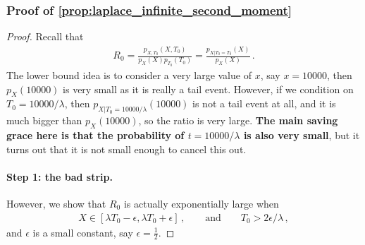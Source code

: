 \subsubsection{Proof of \cref{prop:laplace_infinite_second_moment}}
\label{proof:laplace_infinite_second_moment}
\begin{proof}
    Recall that
    \begin{align}
        R_0
        = \frac{p_{X,T_0}(X, T_0)}{p_X(X) p_{T_0}(T_0)}
        = \frac{p_{X|T_0=T_0}(X)}{p_X(X)}\,.
    \end{align}
    The lower bound idea is to consider a very large value of $x$, say $x=10000$, then $p_X(10000)$ is very small as it is really a tail event.
    However, if we condition on $T_0=10000/\lambda$, then $p_{X|T_0=10000/\lambda}(10000)$ is not a tail event at all, and it is much bigger than $p_X(10000)$, so the ratio is very large.
    \textbf{The main saving grace here is that the probability of $t=10000/\lambda$ is also very small}, but it turns out that it is not small enough to cancel this out.

    \paragraph{Step 1: the bad strip.}
    However, we show that $R_0$ is actually exponentially large when
    \begin{align}
        X \in [\lambda T_0 - \epsilon, \lambda T_0 + \epsilon]\,, \qquad\text{and}\qquad T_0 > 2\epsilon/\lambda\,,
    \end{align}
    and $\epsilon$ is a small constant, say $\epsilon = \frac12$.


\end{proof}
